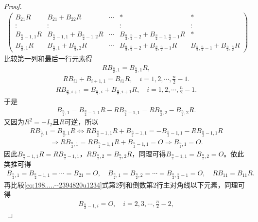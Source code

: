 \documentclass[../../main.tex]{subfiles}
\begin{document}
\begin{proof}
\begin{align}
\begin{pmatrix}
B_{21}R & B_{21} + B_{22}R & \cdots & * & * \\
\vdots & \vdots &  & \vdots & \vdots \\
B_{\frac{n}{2}-1,1}R & B_{\frac{n}{2}-1,1} + B_{\frac{n}{2}-1,2}R & \cdots & B_{\frac{n}{2},\frac{n}{2}-2} + B_{\frac{n}{2}-1,\frac{n}{2}-1}R & * \\
B_{\frac{n}{2},1}R & B_{\frac{n}{2},1} + B_{\frac{n}{2},2}R & \cdots & B_{\frac{n}{2},\frac{n}{2}-2} + B_{\frac{n}{2},\frac{n}{2}-1}R & B_{\frac{n}{2},\frac{n}{2}-1} + B_{\frac{n}{2},\frac{n}{2}}R
\end{pmatrix} \label{eq:198.....--2394820u1234}
\end{align}
比较第一列和最后一行元素得
\begin{align*}
RB_{\frac{n}{2},1} = B_{\frac{n}{2},1}R,
\end{align*}
\begin{align*}
RB_{i1} + B_{i+1,1} = B_{i1}R, \quad i = 1,2,\cdots,\frac{n}{2}-1.
\end{align*}
\begin{align*}
RB_{\frac{n}{2},i+1} = B_{\frac{n}{2},i} + B_{\frac{n}{2},i+1}R, \quad i = 1,2,\cdots,\frac{n}{2}-1.
\end{align*}
于是
\begin{align*}
B_{\frac{n}{2},1} = B_{\frac{n}{2}-1,1}R - RB_{\frac{n}{2}-1,1} = RB_{\frac{n}{2},2} - B_{\frac{n}{2},2}R.
\end{align*}
又因为\(R^2 = -I_2\)且\(R\)可逆，所以
\begin{align*}
RB_{\frac{n}{2},1} = B_{\frac{n}{2},1}R \Longleftrightarrow RB_{\frac{n}{2}-1,1}R + B_{\frac{n}{2}-1,1} = -B_{\frac{n}{2}-1,1} - RB_{\frac{n}{2}-1,1}R
\end{align*}
\begin{align*}
\Longrightarrow RB_{\frac{n}{2},1} = RB_{\frac{n}{2}-1,1}R + B_{\frac{n}{2}-1,1} = O \Longrightarrow B_{\frac{n}{2},1} = O.
\end{align*}
因此\(B_{\frac{n}{2}-1,1}R = RB_{\frac{n}{2}-1,1}\)，\(RB_{\frac{n}{2},2} = B_{\frac{n}{2},2}R\)，同理可得\(B_{\frac{n}{2}-1,1} = B_{\frac{n}{2},2} = O\)。依此类推可得
\begin{align*}
B_{\frac{n}{2},1} = B_{\frac{n}{2}-1,1} = \cdots = B_{21} = O, \quad B_{\frac{n}{2},1} = B_{\frac{n}{2},2} = \cdots = B_{\frac{n}{2},\frac{n}{2}-1} = O, \quad RB_{11} = B_{11}R.
\end{align*}
再比较\eqref{eq:198.....--2394820u1234}式第2列和倒数第2行主对角线以下元素，同理可得
\begin{align*}
B_{\frac{n}{2}-1,i} = O, \quad i = 2,3,\cdots,\frac{n}{2}-2,

\end{align*}
\end{proof}
\end{document}
